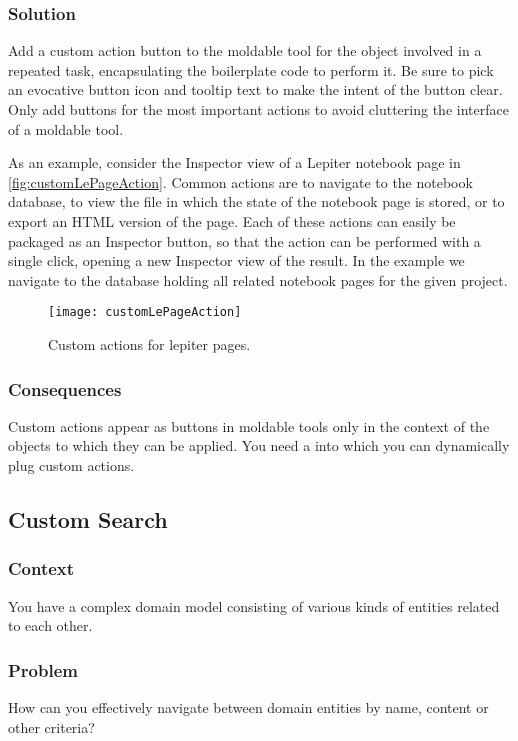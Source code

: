 \documentclass[sigconf]{acmart}
\newcommand{\pattern}[1]{\emph{\nameref{pat:#1}}\xspace}
\begin{document}
\subsubsection*{Solution}
Add a custom action button to the moldable tool for the object involved in a repeated task, encapsulating the boilerplate code to perform it.
Be sure to pick an evocative button icon and tooltip text to make the intent of the button clear.
Only add buttons for the most important actions to avoid cluttering the interface of a moldable tool.

As an example, consider the Inspector view of a Lepiter notebook page in \autoref{fig:customLePageAction}.
Common actions are to navigate to the notebook database, to view the file in which the state of the notebook page is stored, or to export an HTML version of the page.
Each of these actions can easily be packaged as an Inspector button, so that the action can be performed with a single click, opening a new Inspector view of the result.
In the example we navigate to the database holding all related notebook pages for the given project.

\begin{figure}[h]
  \texttt{[image: customLePageAction]}
  \caption{Custom actions for lepiter pages.}
  \label{fig:customLePageAction}
\end{figure}

\subsubsection*{Consequences}
Custom actions appear as buttons in moldable tools only in the context of the objects to which they can be applied.
You need a \pattern{moldableTool} into which you can dynamically plug custom actions.

\subsection*{Custom Search}\label{pat:customSearch}
\subsubsection*{Context}
You have a complex domain model consisting of various kinds of entities related to each other.

\subsubsection*{Problem}
How can you effectively navigate between domain entities by name, content or other criteria?
\end{document}
